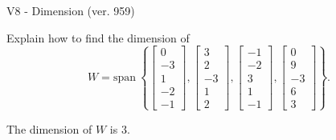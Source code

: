\begin{exercise}
  \begin{exerciseTitle}V8 - Dimension (ver. 959)\end{exerciseTitle}
  \begin{exerciseStatement}
    Explain how to find the dimension of 
\[W=\mathrm{span}\ \left\{\left[\begin{array}{r}
0 \\
-3 \\
1 \\
-2 \\
-1
\end{array}\right] , \left[\begin{array}{r}
3 \\
2 \\
-3 \\
1 \\
2
\end{array}\right] , \left[\begin{array}{r}
-1 \\
-2 \\
3 \\
1 \\
-1
\end{array}\right] , \left[\begin{array}{r}
0 \\
9 \\
-3 \\
6 \\
3
\end{array}\right]\right\}.\]



  \end{exerciseStatement}
  \begin{exerciseAnswer}
   The dimension of \(W\) is  \(3\).
  


  \end{exerciseAnswer}
\end{exercise}